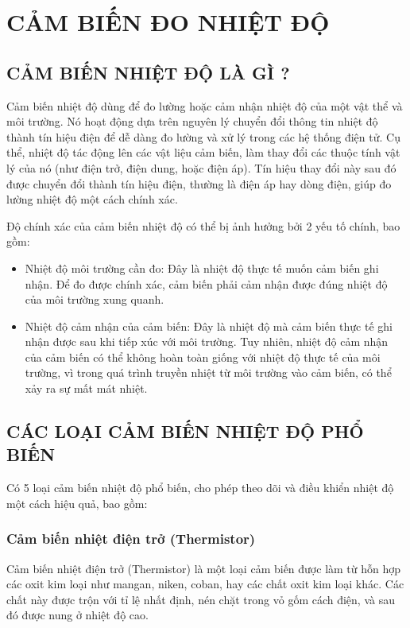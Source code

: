 \documentclass[../DoAn.tex]{subfiles}
\begin{document}
\section{CẢM BIẾN ĐO NHIỆT ĐỘ}
\vspace{1cm}
\subsection{CẢM BIẾN NHIỆT ĐỘ LÀ GÌ ?}
Cảm biến nhiệt độ dùng để đo lường hoặc cảm nhận nhiệt độ của một vật thể và môi trường. Nó hoạt động dựa trên nguyên lý chuyển đổi thông tin nhiệt độ thành tín hiệu điện để dễ dàng đo lường và xử lý trong các hệ thống điện tử. Cụ thể, nhiệt độ tác động lên các vật liệu cảm biến, làm thay đổi các thuộc tính vật lý của nó (như điện trở, điện dung, hoặc điện áp). Tín hiệu thay đổi này sau đó được chuyển đổi thành tín hiệu điện, thường là điện áp hay dòng điện, giúp đo lường nhiệt độ một cách chính xác.

Độ chính xác của cảm biến nhiệt độ có thể bị ảnh hưởng bởi 2 yếu tố chính, bao gồm:

\begin{itemize}
    \item Nhiệt độ môi trường cần đo: Đây là nhiệt độ thực tế muốn cảm biến ghi nhận. Để đo được chính xác, cảm biến phải cảm nhận được đúng nhiệt độ của môi trường xung quanh.
    \item Nhiệt độ cảm nhận của cảm biến: Đây là nhiệt độ mà cảm biến thực tế ghi nhận được sau khi tiếp xúc với môi trường. Tuy nhiên, nhiệt độ cảm nhận của cảm biến có thể không hoàn toàn giống với nhiệt độ thực tế của môi trường, vì trong quá trình truyền nhiệt từ môi trường vào cảm biến, có thể xảy ra sự mất mát nhiệt.
\end{itemize}
\subsection{CÁC LOẠI CẢM BIẾN NHIỆT ĐỘ PHỔ BIẾN}
Có 5 loại cảm biến nhiệt độ phổ biến, cho phép theo dõi và điều khiển nhiệt độ một cách hiệu quả, bao gồm:
\subsubsection{Cảm biến nhiệt điện trở (Thermistor)}
Cảm biến nhiệt điện trở (Thermistor) là một loại cảm biến được làm từ hỗn hợp các oxit kim loại như mangan, niken, coban, hay các chất oxit kim loại khác. Các chất này được trộn với tỉ lệ nhất định, nén chặt trong vỏ gốm cách điện, và sau đó được nung ở nhiệt độ cao.
\end{document}
